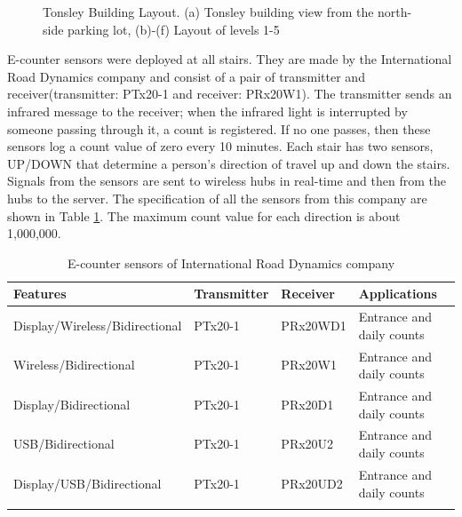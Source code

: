 \begin{figure}[ht]
\caption{Tonsley Building Layout. (a) Tonsley building view from the north-side parking lot, (b)-(f) Layout of levels 1-5}
\label{laay}
\end{figure}

E-counter sensors were deployed at all stairs. They are made by the International Road Dynamics company and consist of a pair of transmitter and receiver(transmitter: PTx20-1 and receiver: PRx20W1). The transmitter sends an infrared message to the receiver; when the infrared light is interrupted by someone passing through it, a count is registered. If no one passes, then these sensors log a count value of zero every 10 minutes. Each stair has two sensors, UP/DOWN that determine a person's direction of travel up and down the stairs. Signals from the sensors are sent to wireless hubs in real-time and then from the hubs to the server. The specification of all the sensors from this company are shown in Table \ref{sensor}. The maximum count value for each direction is about 1,000,000.

\begin{table}[!ht]
 \small
\centering
\caption{E-counter sensors of International Road Dynamics company}%
\begin{tabular}{llll}
 \toprule
\textbf{Features} & \textbf{Transmitter} & \textbf{Receiver}  & \textbf{Applications}     \\
\midrule
 Display/Wireless/Bidirectional     &  PTx20-1 & PRx20WD1 & Entrance and daily counts\\ 
Wireless/Bidirectional             &  PTx20-1 & PRx20W1  & Entrance and daily counts\\ 
 Display/Bidirectional              &  PTx20-1 & PRx20D1  & Entrance and daily counts\\ 
 USB/Bidirectional                  &  PTx20-1 & PRx20U2  & Entrance and daily counts\\ 
 Display/USB/Bidirectional          &  PTx20-1 & PRx20UD2 & Entrance and daily counts\\ 
 \bottomrule
 \label{sensor}
 \end{tabular}
 \end{table}


